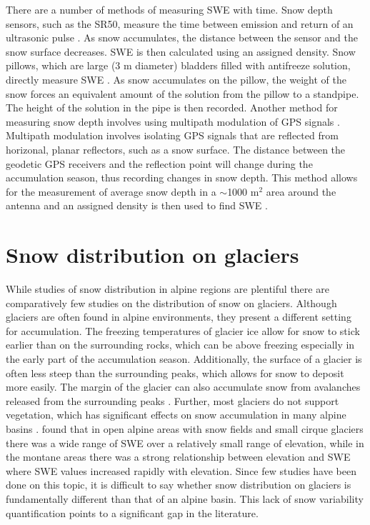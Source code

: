 \documentclass{sfuthesis}
\begin{document}
There are a number of methods of measuring SWE with time. Snow depth sensors, such as the SR50, measure the time between emission and return of an ultrasonic pulse \citep{Ryan2008}. As snow accumulates, the distance between the sensor and the snow surface decreases. SWE is then calculated using an assigned density. Snow pillows, which are large (3 m diameter) bladders filled with antifreeze solution, directly measure SWE \citep{Archer1995}. As snow accumulates on the pillow, the weight of the snow forces an equivalent amount of the solution from the pillow to a standpipe. The height of the solution in the pipe is then recorded. Another method for measuring snow depth involves using multipath modulation of GPS signals \citep{Larson2009,McCreight2014}. Multipath modulation involves isolating GPS signals that are reflected from horizonal, planar reflectors, such as a snow surface. The distance between the geodetic GPS receivers and the reflection point will change during the accumulation season, thus recording changes in snow depth. This method allows for the measurement of average snow depth in a $\sim$1000 m$^2$ area around the antenna and an assigned density is then used to find SWE \citep{McCreight2014}.

\section{Snow distribution on glaciers}
While studies of snow distribution in alpine regions are plentiful \citep[and sources within]{Clark2011} there are comparatively few studies on the distribution of snow on glaciers. Although glaciers are often found in alpine environments, they present a different setting for accumulation. The freezing temperatures of glacier ice allow for snow to stick earlier than on the surrounding rocks, which can be above freezing especially in the early part of the accumulation season. Additionally, the surface of a glacier is often less steep than the surrounding peaks, which allows for snow to deposit more easily. The margin of the glacier can also accumulate snow from avalanches released from the surrounding peaks \citep{Bloschl1991, Mott2008}. Further, most glaciers do not support vegetation, which has significant effects on snow accumulation in many alpine basins \citep{Pomeroy1999}. \cite{Alford1985} found that in open alpine areas with snow fields and small cirque glaciers there was a wide range of SWE over a relatively small range of elevation, while in the montane areas there was a strong relationship between elevation and SWE where SWE values increased rapidly with elevation. Since few studies have been done on this topic, it is difficult to say whether snow distribution on glaciers is fundamentally different than that of an alpine basin. This lack of snow variability quantification points to a significant gap in the literature.
\end{document}
